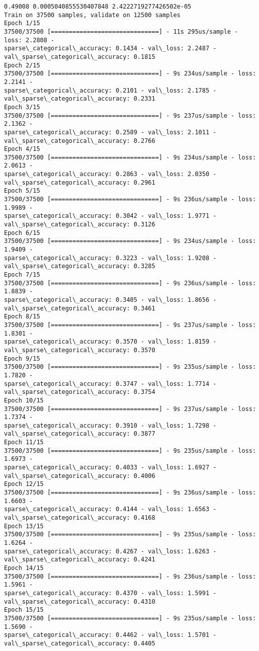 \documentclass[11pt]{article}
\begin{document}
    \begin{Verbatim}[commandchars=\\\{\}]
0.49008 0.0005040855530407848 2.4222719277426502e-05
Train on 37500 samples, validate on 12500 samples
Epoch 1/15
37500/37500 [==============================] - 11s 295us/sample - loss: 2.2808 -
sparse\_categorical\_accuracy: 0.1434 - val\_loss: 2.2487 -
val\_sparse\_categorical\_accuracy: 0.1815
Epoch 2/15
37500/37500 [==============================] - 9s 234us/sample - loss: 2.2141 -
sparse\_categorical\_accuracy: 0.2101 - val\_loss: 2.1785 -
val\_sparse\_categorical\_accuracy: 0.2331
Epoch 3/15
37500/37500 [==============================] - 9s 237us/sample - loss: 2.1362 -
sparse\_categorical\_accuracy: 0.2589 - val\_loss: 2.1011 -
val\_sparse\_categorical\_accuracy: 0.2766
Epoch 4/15
37500/37500 [==============================] - 9s 234us/sample - loss: 2.0613 -
sparse\_categorical\_accuracy: 0.2863 - val\_loss: 2.0350 -
val\_sparse\_categorical\_accuracy: 0.2961
Epoch 5/15
37500/37500 [==============================] - 9s 236us/sample - loss: 1.9989 -
sparse\_categorical\_accuracy: 0.3042 - val\_loss: 1.9771 -
val\_sparse\_categorical\_accuracy: 0.3126
Epoch 6/15
37500/37500 [==============================] - 9s 234us/sample - loss: 1.9409 -
sparse\_categorical\_accuracy: 0.3223 - val\_loss: 1.9208 -
val\_sparse\_categorical\_accuracy: 0.3285
Epoch 7/15
37500/37500 [==============================] - 9s 236us/sample - loss: 1.8839 -
sparse\_categorical\_accuracy: 0.3405 - val\_loss: 1.8656 -
val\_sparse\_categorical\_accuracy: 0.3461
Epoch 8/15
37500/37500 [==============================] - 9s 237us/sample - loss: 1.8301 -
sparse\_categorical\_accuracy: 0.3570 - val\_loss: 1.8159 -
val\_sparse\_categorical\_accuracy: 0.3570
Epoch 9/15
37500/37500 [==============================] - 9s 235us/sample - loss: 1.7820 -
sparse\_categorical\_accuracy: 0.3747 - val\_loss: 1.7714 -
val\_sparse\_categorical\_accuracy: 0.3754
Epoch 10/15
37500/37500 [==============================] - 9s 237us/sample - loss: 1.7374 -
sparse\_categorical\_accuracy: 0.3910 - val\_loss: 1.7298 -
val\_sparse\_categorical\_accuracy: 0.3877
Epoch 11/15
37500/37500 [==============================] - 9s 235us/sample - loss: 1.6973 -
sparse\_categorical\_accuracy: 0.4033 - val\_loss: 1.6927 -
val\_sparse\_categorical\_accuracy: 0.4006
Epoch 12/15
37500/37500 [==============================] - 9s 236us/sample - loss: 1.6603 -
sparse\_categorical\_accuracy: 0.4144 - val\_loss: 1.6563 -
val\_sparse\_categorical\_accuracy: 0.4168
Epoch 13/15
37500/37500 [==============================] - 9s 235us/sample - loss: 1.6264 -
sparse\_categorical\_accuracy: 0.4267 - val\_loss: 1.6263 -
val\_sparse\_categorical\_accuracy: 0.4241
Epoch 14/15
37500/37500 [==============================] - 9s 236us/sample - loss: 1.5961 -
sparse\_categorical\_accuracy: 0.4370 - val\_loss: 1.5991 -
val\_sparse\_categorical\_accuracy: 0.4310
Epoch 15/15
37500/37500 [==============================] - 9s 235us/sample - loss: 1.5690 -
sparse\_categorical\_accuracy: 0.4462 - val\_loss: 1.5701 -
val\_sparse\_categorical\_accuracy: 0.4405
    \end{Verbatim}
\end{document}
